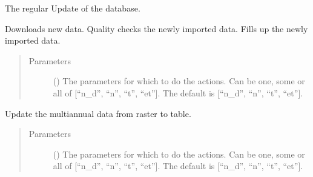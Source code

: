 \documentclass[letterpaper,10pt,english]{sphinxmanual}
\begin{document}
\begin{fulllineitems}

\begin{fulllineitems}
\label{\detokenize{weatherDB:weatherDB.broker.Broker.update_db}}
\sphinxAtStartPar
The regular Update of the database.

\sphinxAtStartPar
Downloads new data.
Quality checks the newly imported data.
Fills up the newly imported data.
\begin{quote}\begin{description}
\item[{Parameters}] \leavevmode
\sphinxAtStartPar
{} (\sphinxstyleliteralemphasis{\sphinxupquote{, }}) \textendash{} The parameters for which to do the actions.
Can be one, some or all of {[}“n\_d”, “n”, “t”, “et”{]}.
The default is {[}“n\_d”, “n”, “t”, “et”{]}.

\end{description}\end{quote}

\end{fulllineitems}


\begin{fulllineitems}
\label{\detokenize{weatherDB:weatherDB.broker.Broker.update_ma}}
\sphinxAtStartPar
Update the multi\sphinxhyphen{}annual data from raster to table.
\begin{quote}\begin{description}
\item[{Parameters}] \leavevmode
\sphinxAtStartPar
{} (\sphinxstyleliteralemphasis{\sphinxupquote{, }}) \textendash{} The parameters for which to do the actions.
Can be one, some or all of {[}“n\_d”, “n”, “t”, “et”{]}.
The default is {[}“n\_d”, “n”, “t”, “et”{]}.


\end{description}
\end{quote}
\end{fulllineitems}
\end{fulllineitems}
\end{document}
